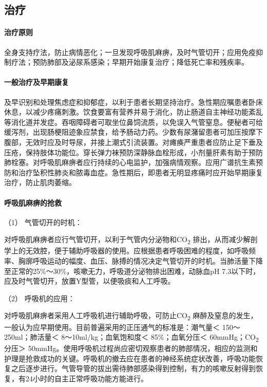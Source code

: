 \subsection{治疗}

\paragraph{治疗原则}

全身支持疗法，防止病情恶化；一旦发现呼吸肌麻痹，及时气管切开；应用免疫抑制疗法；预防肺部及泌尿系感染；早期开始康复治疗；降低死亡率和残疾率。

\paragraph{一般治疗及早期康复}

及早识别和处理焦虑症和抑郁症，以利于患者长期坚持治疗。急性期应嘱患者卧床休息，以减少疼痛刺激。饮食要富有营养并易于消化，防止肠道自主神经功能紊乱等消化道并发症。吞咽障碍者可取坐位鼻饲流质，以免误入气管窒息。便秘者可给缓泻剂，出现肠梗阻迹象应禁食，给予肠动力药。少数有尿潴留患者可加压按摩下腹部，无效时应及时导尿，并接上潮式引流装置。对瘫痪严重患者应防止足下垂及压疮，保持肢体功能位。穿长弹力袜预防深静脉血栓形成，小剂量肝素有助于预防肺栓塞。对呼吸肌麻痹者应行持续的心电监护，加强病情观察。应用广谱抗生素预防和治疗坠积性肺炎和脓毒血症。急性期后，即患者无明显疼痛时应开始早期康复治疗，防止肌肉萎缩。

\paragraph{呼吸肌麻痹的抢救}

\hypertarget{text00260.htmlux5cux23CHP8-8-3-3-1}{}
（1） 气管切开的时机：

对呼吸肌麻痹者应行气管切开，以利于气管内分泌物和CO\textsubscript{2}
排出，从而减少解剖学上的无效腔，便于辅助呼吸器的使用。应根据患者呼吸困难的程度，如呼吸频率、胸廓呼吸运动的幅度、血压、脉搏的情况决定气管切开的时机。当肺活量下降至正常的25\%～30\%，咳嗽无力，呼吸道分泌物排出困难，动脉血pH
7.3以下时，应及时气管切开，放置Y型管，以便吸痰和人工呼吸。

\hypertarget{text00260.htmlux5cux23CHP8-8-3-3-2}{}
（2） 呼吸机的应用：

对呼吸肌麻痹者采用人工呼吸机进行辅助呼吸，可防止CO\textsubscript{2}
麻醉及窒息的发生，一般认为应早期使用。目前普遍采用的正压通气的标准是：潮气量＜
150～250ml；肺活量＜ 8～10ml/kg；血氧饱和度＜ 85\%；血氧分压＜
60mmHg；CO\textsubscript{2} 分压＞
50mmHg。使用呼吸机过程尚应密切观察患者的肺部情况，相应的监测和护理是抢救成功的关键。呼吸机的撤去应在患者的神经系统症状改善，呼吸功能恢复之后逐步进行。气管导管的拔出需待肺部感染得到控制，有力的咳嗽反射得到恢复，有24小时的自主正常呼吸功能方能进行。

